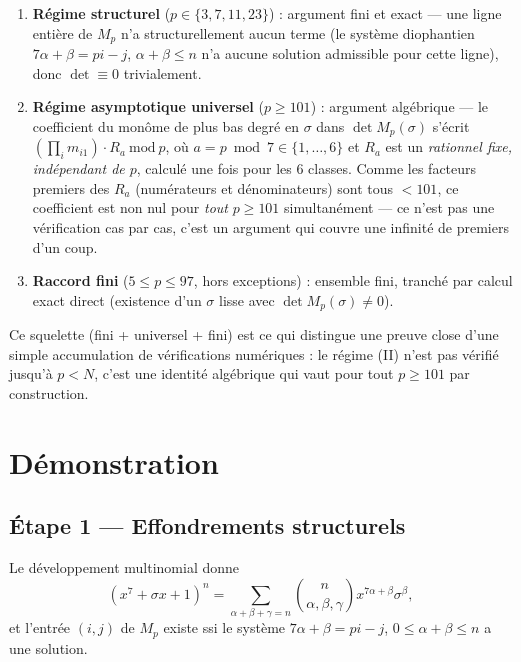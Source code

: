 \documentclass[12pt,a4paper]{article}
\theoremstyle{definition}
\begin{document}
\begin{enumerate}
\item[\textbf{(I)}] \textbf{Régime structurel} ($p\in\{3,7,11,23\}$) : argument fini et exact — une ligne entière de $M_p$ n'a structurellement aucun terme (le système diophantien $7\alpha+\beta=pi-j$, $\alpha+\beta\le n$ n'a aucune solution admissible pour cette ligne), donc $\det\equiv0$ trivialement.
\item[\textbf{(II)}] \textbf{Régime asymptotique universel} ($p\ge101$) : argument algébrique — le coefficient du monôme de plus bas degré en $\sigma$ dans $\det M_p(\sigma)$ s'écrit $(\prod_i m_{i1})\cdot R_a\ \mathrm{mod}\ p$, où $a=p\bmod7\in\{1,\dots,6\}$ et $R_a$ est un \emph{rationnel fixe, indépendant de $p$}, calculé une fois pour les 6 classes. Comme les facteurs premiers des $R_a$ (numérateurs et dénominateurs) sont tous $<101$, ce coefficient est non nul pour \emph{tout} $p\ge101$ simultanément — ce n'est pas une vérification cas par cas, c'est un argument qui couvre une infinité de premiers d'un coup.
\item[\textbf{(III)}] \textbf{Raccord fini} ($5\le p\le97$, hors exceptions) : ensemble fini, tranché par calcul exact direct (existence d'un $\sigma$ lisse avec $\det M_p(\sigma)\ne0$).
\end{enumerate}

Ce squelette (fini + universel + fini) est ce qui distingue une preuve close d'une simple accumulation de vérifications numériques : le régime (II) n'est pas \og vérifié jusqu'à $p<N$\fg, c'est une identité algébrique qui vaut pour tout $p\ge101$ par construction.

\section{Démonstration}

\subsection{Étape 1 — Effondrements structurels}

Le développement multinomial donne
\[
(x^7+\sigma x+1)^n=\sum_{\alpha+\beta+\gamma=n}\binom{n}{\alpha,\beta,\gamma}x^{7\alpha+\beta}\sigma^\beta,
\]
et l'entrée $(i,j)$ de $M_p$ existe ssi le système $7\alpha+\beta=pi-j$, $0\le\alpha+\beta\le n$ a une solution.
\end{document}
